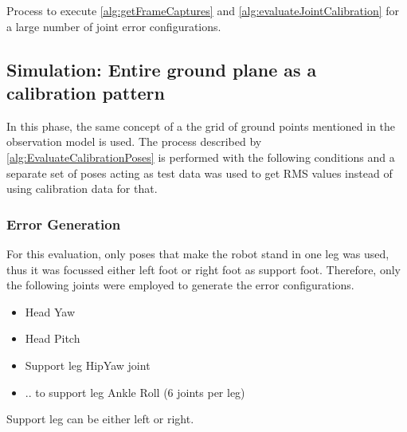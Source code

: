 \documentclass[english, printversion, nomenclature, notitle]{tuvisionthesis} %
\begin{document}
\begin{algorithm}[H]
	\caption{Process to execute \cref{alg:getFrameCaptures} and \cref{alg:evaluateJointCalibration} for a large number of joint error configurations.}	\label{alg:EvaluateCalibrationPoses}
	\BlankLine
\end{algorithm}

\subsection{Simulation: Entire ground plane as a calibration pattern}
\label{subsec:simGroundTest}
In this phase, the same concept of a the grid of ground points mentioned in the observation model is used. The process described by \cref{alg:EvaluateCalibrationPoses} is performed with the following conditions and a separate set of poses acting as test data was used to get RMS values instead of using calibration data for that.


\subsubsection{Error Generation}
For this evaluation, only poses that make the robot stand in one leg was used, thus it was focussed either left foot or right foot as support foot. Therefore, only the following joints were employed to generate the error configurations.

\begin{itemize}
	\item Head Yaw
	\item Head Pitch
	\item Support leg HipYaw joint
	\item .. to support leg Ankle Roll (6 joints per leg)
\end{itemize}
Support leg can be either left or right.
\end{document}
